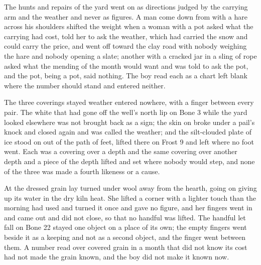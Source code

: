 The hunts and repairs of the yard went on as directions judged by the carrying arm and the weather and never as figures. A man come down from  with a hare across his shoulders shifted the weight when a woman with a pot asked what the carrying had cost, told her to ask the weather, which had carried the snow and could carry the price, and went off toward the clay road with nobody weighing the hare and nobody opening a slate; another with a cracked jar in a sling of rope asked what the mending of the month would want and was told to ask the pot, and the pot, being a pot, said nothing. The boy read each as a chart left blank where the number should stand and entered neither.

The three coverings stayed weather entered nowhere, with a finger between every pair. The white that had gone off the well's north lip on Bone 3 while the yard looked elsewhere was not brought back as a sign; the skin on  broke under a pail's knock and closed again and was called the weather; and the silt-clouded plate of ice stood on  out of the path of feet, lifted there on Frost 9 and left where no foot went. Each was a covering over a depth and the same covering over another depth and a piece of the depth lifted and set where nobody would step, and none of the three was made a fourth likeness or a cause.

At  the dressed grain lay turned under wool away from the hearth, going on giving up its water in the dry kiln heat. She lifted a corner with a lighter touch than the morning had used and turned it once and gave no figure, and her fingers went in and came out and did not close, so that no handful was lifted. The handful let fall on Bone 22 stayed one object on a place of its own; the empty fingers went beside it as a keeping and not as a second object, and the finger went between them. A number read over covered grain in a month that did not know its cost had not made the grain known, and the boy did not make it known now.

